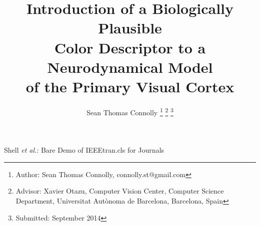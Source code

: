 \documentclass[journal,onecolumn]{IEEEtran}
\begin{document}
\title{Introduction of a Biologically Plausible \\ Color Descriptor to a Neurodynamical Model \\ of the Primary Visual Cortex}
%
%
%

\author{Sean Thomas Connolly%
\thanks{Author: Sean Thomas Connolly, connolly.st@gmail.com}%
\thanks{Advisor: Xavier Otazu,  Computer Vision Center, Computer Science Department, Universitat Autònoma de Barcelona, Barcelona, Spain }%
\thanks{Submitted: September 2014}}

% 
%



%
{Shell \MakeLowercase{\textit{et al.}}: Bare Demo of IEEEtran.cls for Journals}



\maketitle
\end{document}
